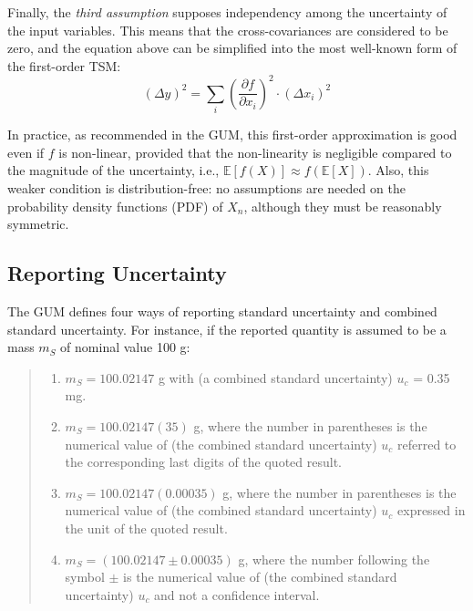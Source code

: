 \documentclass[twoside,nohyper]{tufte-book}
\providecommand{\tightlist}{%
  \setlength{\itemsep}{0pt}\setlength{\parskip}{0pt}}
\begin{document}
\pagebreak

Finally, the \emph{third assumption} supposes independency among the uncertainty of the input variables. This means that the cross-covariances are considered to be zero, and the equation above can be simplified into the most well-known form of the first-order TSM:
%
\begin{equation}
  \left(\Delta y\right)^2 = \sum_i \left(\frac{\partial f}{\partial x_i}\right)^2\cdot \left(\Delta x_i\right)^2 \label{eq:TSM}
\end{equation}
%


In practice, as recommended in the GUM, this first-order approximation is good even if \(f\) is non-linear, provided that the non-linearity is negligible compared to the magnitude of the uncertainty, i.e., \(\mathbb{E}[f(X)]\approx f(\mathbb{E}[X])\). Also, this weaker condition is distribution-free: no assumptions are needed on the probability density functions (PDF) of \(X_n\), although they must be reasonably symmetric.

\hypertarget{reporting-uncertainty}{%
\subsection{Reporting Uncertainty}\label{reporting-uncertainty}}

The GUM defines four ways of reporting standard uncertainty and combined standard uncertainty. For instance, if the reported quantity is assumed to be a mass \(m_S\) of nominal value 100 g:

\begin{quote}
\begin{enumerate}
\def\labelenumi{\arabic{enumi}.}
\tightlist
\item
  \(m_S = 100.02147\) g with (a combined standard uncertainty) \(u_c\) = 0.35 mg.
\item
  \(m_S = 100.02147(35)\) g, where the number in parentheses is the numerical value of (the combined standard uncertainty) \(u_c\) referred to the corresponding last digits of the quoted result.
\item
  \(m_S = 100.02147(0.00035)\) g, where the number in parentheses is the numerical value of (the combined standard uncertainty) \(u_c\) expressed in the unit of the quoted result.
\item
  \(m_S = (100.02147 \pm 0.00035)\) g, where the number following the symbol \(\pm\) is the numerical value of (the combined standard uncertainty) \(u_c\) and not a confidence interval.
\end{enumerate}
\end{quote}
\end{document}

